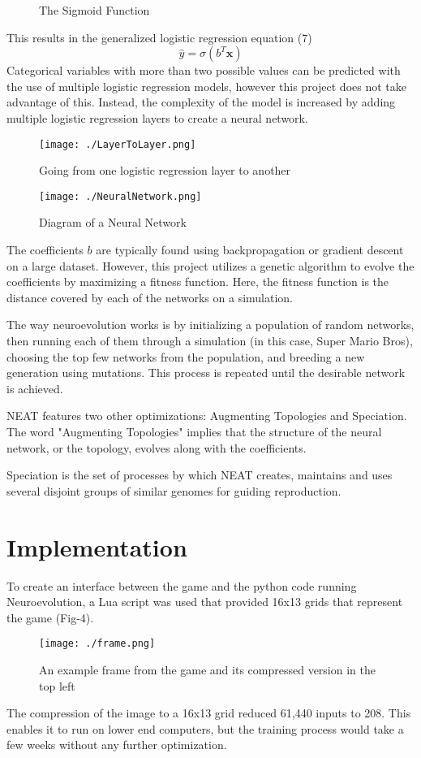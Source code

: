 \documentclass[11pt]{article}
\begin{document}
\begin{multicols}{2}
\begin{figure}[H]
{The Sigmoid Function
}
\end{figure}
This results in the generalized logistic regression equation (7)
\begin{equation}
\hat{y} = \sigma(b^T \textbf{x})
\end{equation}
Categorical variables with more than two possible values can be predicted with the use of multiple
logistic regression models, however this project does not take advantage of this.
Instead, the complexity of the model is increased by adding multiple logistic regression layers to create a neural network.
\begin{figure}[H]
\centering
\texttt{[image: ./LayerToLayer.png]}
\caption{\label{fig:posvsfreq}
Going from one logistic regression layer to another
}
\end{figure}
\begin{figure}[H]
\centering
\texttt{[image: ./NeuralNetwork.png]}
\caption{\label{fig:posvsfreq}
Diagram of a Neural Network
}
\end{figure}
The coefficients $b$ are typically found using backpropagation or gradient descent on a large dataset. 
However, this project utilizes a genetic algorithm to evolve the coefficients by maximizing a fitness function.
Here, the fitness function is the distance covered by each of the networks on a simulation.

The way neuroevolution works is by initializing a population of random networks, then running each of them through a 
simulation (in this case, Super Mario Bros), choosing the top few networks from the population, and breeding a
new generation using mutations. This process is repeated until the desirable network is achieved.

NEAT features two other optimizations: Augmenting Topologies and Speciation. The word
"Augmenting Topologies" implies that the structure of the neural network, or the topology, evolves along
with the coefficients. 

Speciation is the set of processes by which NEAT creates, maintains and uses several disjoint groups of 
similar genomes for guiding reproduction.
\section{Implementation}
\label{sec:orgfd5e641}
To create an interface between the game and the python code running Neuroevolution, 
a Lua script was used that provided 16x13 grids that represent the game (Fig-4).
\begin{figure}[H]
\centering
\texttt{[image: ./frame.png]}
\caption{\label{fig:posvsfreq}
An example frame from the game and its compressed version in the top left
}
\end{figure}     
The compression of the image to a 16x13 grid reduced 61,440 inputs to 208. 
This enables it to run on lower end computers, but the training process would take
a few weeks without any further optimization.


\end{multicols}
\end{document}
